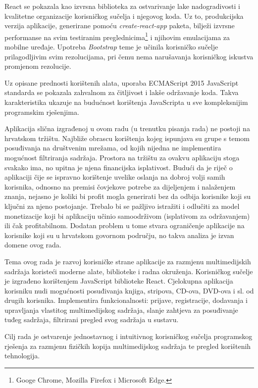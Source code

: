 \documentclass[times, utf8, zavrsni, numeric]{fer}
\newcommand{\razmakp}{\vspace{18pt}}
\begin{document}
\razmakp

React se pokazala kao izvrsna biblioteka za ostvarivanje lake nadogradivosti i kvalitetne organizacije korisničkog sučelja i njegovog koda.
Uz to, produkcijska verzija aplikacije, generirane pomoću \emph{create-react-app} paketa, bilježi izvrsne performanse na svim testiranim preglednicima\footnote{Googe Chrome, Mozilla Firefox i Microsoft Edge.} i njihovim emulacijama za mobilne uređaje.
Upotreba \emph{Bootstrap} teme je učinila korisničko sučelje prilagodljivim svim rezolucijama, pri čemu nema narušavanja korisničkog iskustva promjenom rezolucije.

Uz opisane prednosti korištenih alata, uporaba ECMAScript 2015 JavaScript standarda se pokazala zahvalnom za čitljivost i lakše održavanje koda.
Takva karakteristika ukazuje na budućnost korištenja JavaScripta u sve kompleksnijim programskim rješenjima.

\razmakp

Aplikacija slična izgrađenoj u ovom radu (u trenutku pisanja rada) ne postoji na hrvatskom tržištu.
Najbliže obrascu korištenja kojeg ispunjava su grupe s temom posuđivanja na društvenim mrežama, od kojih nijedna ne implementira mogućnost filtriranja sadržaja.
Prostora na tržištu za ovakvu aplikaciju stoga svakako ima, no upitna je njena financijska isplativost.
Budući da je riječ o aplikaciji čije se ispravno korištenje uvelike oslanja na dobroj volji samih korisnika, odnosno na premisi čovjekove potrebe za dijeljenjem i nalaženjem znanja, nejasno je koliki bi profit mogla generirati bez da odbija korisnike koji su ključni za njeno postojanje.
Trebalo bi se pažljivo istražiti i odlučiti za model monetizacije koji bi aplikaciju učinio samoodrživom (isplativom za održavanjem) ili čak profitabilnom.
Dodatan problem u tome stvara ograničenje aplikacije na korisnike koji su u hrvatskom govornom području, no takva analiza je izvan domene ovog rada.







\begin{sazetak}
Tema ovog rada je razvoj korisničke strane aplikacije za razmjenu multimedijskih sadržaja koristeći moderne alate, biblioteke i radna okruženja.
Korisničkog sučelje je izgrađeno korištenjem JavaScript biblioteke React.
Cjelokupna aplikacija korisniku nudi mogućnosti posuđivanja knjiga, stripova, CD-ova, DVD-ova i sl. od drugih korisnika.
Implementira funkcionalnosti: prijave, registracije, dodavanja i upravljanja vlastitog multimedijskog sadržaja, slanje zahtjeva za posuđivanje tuđeg sadržaja, filtrirani pregled svog sadržaja u sustavu.

Cilj rada je ostvarenje jednostavnog i intuitivnog korisničkog sučelja programskog rješenja za razmjenu fizičkih kopija multimedijskog sadržaja te pregled korištenih tehnologija.

\end{sazetak}
\end{document}
